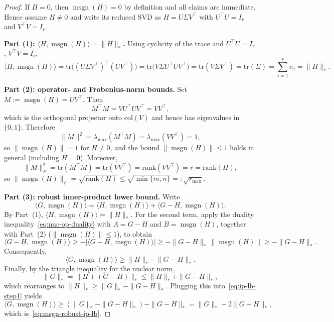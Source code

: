\documentclass{article}
\begin{document}
\begin{proof}
If $H=0$, then $\operatorname{msgn}(H)=0$ by definition and all claims are immediate. Hence assume $H\neq 0$ and write its reduced SVD as $H=U\Sigma V^{\top}$ with $U^{\top}U=I_r$ and $V^{\top}V=I_r$.

\medskip\noindent\textbf{Part (1): $\langle H,\operatorname{msgn}(H)\rangle=\|H\|_*$.}
Using cyclicity of the trace and $U^{\top}U=I_r$, $V^{\top}V=I_r$,
\[
\langle H,\operatorname{msgn}(H)\rangle
=\mathrm{tr}\bigl((U\Sigma V^{\top})^{\top}(UV^{\top})\bigr)
=\mathrm{tr}\bigl(V\Sigma U^{\top}U V^{\top}\bigr)
=\mathrm{tr}(V\Sigma V^{\top})
=\mathrm{tr}(\Sigma)
=\sum_{i=1}^r \sigma_i
=\|H\|_*.
\]

\medskip\noindent\textbf{Part (2): operator- and Frobenius-norm bounds.}
Set $M:=\operatorname{msgn}(H)=UV^{\top}$. Then
\[
M^{\top}M = VU^{\top}UV^{\top} = VV^{\top},
\]
which is the orthogonal projector onto $\mathrm{col}(V)$ and hence has eigenvalues in $\{0,1\}$. Therefore
\[
\|M\|^2 = \lambda_{\max}(M^{\top}M) = \lambda_{\max}(VV^{\top}) = 1,
\]
so $\|\operatorname{msgn}(H)\|=1$ for $H\neq 0$, and the bound $\|\operatorname{msgn}(H)\|\le 1$ holds in general (including $H=0$).
Moreover,
\[
\|M\|_F^2 = \mathrm{tr}(M^{\top}M) = \mathrm{tr}(VV^{\top}) = \mathrm{rank}(VV^{\top}) = r = \mathrm{rank}(H),
\]
so $\|\operatorname{msgn}(H)\|_F=\sqrt{\mathrm{rank}(H)}\le \sqrt{\min\{m,n\}}=: \sqrt{r_{\max}}$.

\medskip\noindent\textbf{Part (3): robust inner-product lower bound.}
Write
\[
\langle G,\operatorname{msgn}(H)\rangle
= \langle H,\operatorname{msgn}(H)\rangle + \langle G-H,\operatorname{msgn}(H)\rangle.
\]
By Part~(1), $\langle H,\operatorname{msgn}(H)\rangle=\|H\|_*$. For the second term, apply the duality inequality~\eqref{eq:nuc-op-duality} with $A=G-H$ and $B=\operatorname{msgn}(H)$, together with Part~(2) ($\|\operatorname{msgn}(H)\|\le 1$), to obtain
\[
\langle G-H,\operatorname{msgn}(H)\rangle \ge -|\langle G-H,\operatorname{msgn}(H)\rangle|
\ge -\|G-H\|_*\,\|\operatorname{msgn}(H)\|
\ge -\|G-H\|_*.
\]
Consequently,
\begin{equation}
\label{eq:ip-lb-step1}
\langle G,\operatorname{msgn}(H)\rangle \ge \|H\|_* - \|G-H\|_*.
\end{equation}
Finally, by the triangle inequality for the nuclear norm,
\[
\|G\|_* = \|H + (G-H)\|_* \le \|H\|_* + \|G-H\|_*,
\]
which rearranges to $\|H\|_* \ge \|G\|_* - \|G-H\|_*$. Plugging this into~\eqref{eq:ip-lb-step1} yields
\[
\langle G,\operatorname{msgn}(H)\rangle \ge (\|G\|_* - \|G-H\|_*) - \|G-H\|_* = \|G\|_* - 2\|G-H\|_*,
\]
which is~\eqref{eq:msgn-robust-ip-lb}.
\end{proof}
\end{document}
